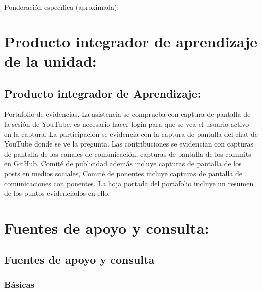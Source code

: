 \documentclass[10 pt]{article}
\begin{document}
  
  Ponderaci\'{o}n espec\'{\i}fica (aproximada):


  
  \newpage

\section{Producto integrador de aprendizaje de la unidad:}
\subsection{Producto integrador de Aprendizaje:} Portafolio de
evidencias.  La asistencia se comprueba con captura de pantalla de la
sesi\'{o}n de YouTube; es necesario hacer login para que se vea el
usuario activo en la captura. La participaci\'{o}n se evidencia con la
captura de pantalla del chat de YouTube donde se ve la pregunta. Las
contribuciones se evidencian con capturas de pantalla de los canales
de comunicaci\'{o}n, capturas de pantalla de los commits en
GitHub. Comit\'{e} de publicidad adem\'{a}s incluye capturas de
pantalla de los posts en medios sociales, Comit\'{e} de ponentes
incluye capturas de pantalla de comunicaciones con ponentes. La hoja
portada del portafolio incluye un resumen de los puntos evidenciados
en ello.


\section{Fuentes de apoyo y consulta:}
\subsection{Fuentes de apoyo y consulta}
\subsubsection{B\'{a}sicas}
\end{document}
